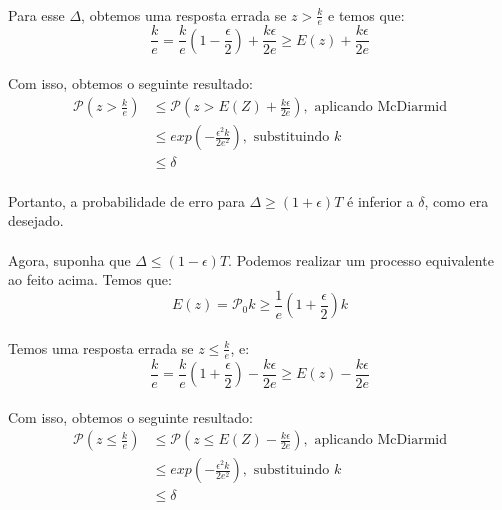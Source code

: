 \paragraph{}Para esse $\Delta$, obtemos uma resposta errada se $z > \frac{k}{e}$ e temos que:
\begin{equation*}
\frac{k}{e} = \frac{k}{e}\left(1-\frac{\epsilon}{2}\right) + \frac{k\epsilon}{2e} \geq E(z) + \frac{k\epsilon}{2e}    
\end{equation*}
\paragraph{}Com isso, obtemos o seguinte resultado:
\begin{align*}
    \mathcal{P}\left(z>\frac{k}{e}\right) &\leq \mathcal{P}\left(z > E(Z)+\frac{k\epsilon}{2e}\right),\text{ aplicando McDiarmid}\\
    &\leq exp\left(-\frac{\epsilon^2k}{2e^2}\right), \text{ substituindo $k$}\\
    &\leq \delta        
\end{align*}    
\paragraph{}Portanto, a probabilidade de erro para $\Delta \geq \left(1+\epsilon\right)T$ é inferior a $\delta$, como era desejado.
\paragraph{}Agora, suponha que $\Delta \leq (1-\epsilon)T$. Podemos realizar um processo equivalente ao feito acima. Temos que:
\begin{equation*}
E(z) = \mathcal{P}_0 k \geq \frac{1}{e}\left(1+\frac{\epsilon}{2}\right)k    
\end{equation*}

\paragraph{} Temos uma resposta errada se $z \leq \frac{k}{e}$, e:
\begin{equation*}
\frac{k}{e} = \frac{k}{e}\left(1+\frac{\epsilon}{2}\right) - \frac{k\epsilon}{2e} \geq E(z) - \frac{k\epsilon}{2e}    
\end{equation*}

\paragraph{}Com isso, obtemos o seguinte resultado:
\begin{align*}
    \mathcal{P}\left(z \leq \frac{k}{e}\right) &\leq \mathcal{P}\left( z \leq E(Z) - \frac{k\epsilon}{2e}\right),\text{ aplicando McDiarmid}\\
    &\leq exp\left(-\frac{\epsilon^2k}{2e^2}\right), \text{ substituindo $k$}\\
    &\leq \delta        
\end{align*}

